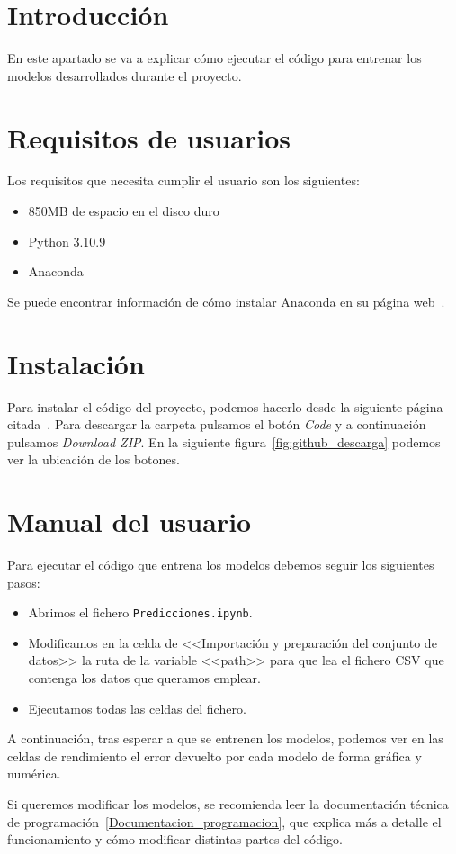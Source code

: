 
\section{Introducción}

En este apartado se va a explicar cómo ejecutar el código para entrenar los modelos desarrollados durante el proyecto.

\section{Requisitos de usuarios}

Los requisitos que necesita cumplir el usuario son los siguientes:

\begin{itemize}
    \item 850MB de espacio en el disco duro
    \item Python 3.10.9
    \item Anaconda
\end{itemize}

Se puede encontrar información de cómo instalar Anaconda en su página web~\cite{anaconda}.

\section{Instalación}

Para instalar el código del proyecto, podemos hacerlo desde la siguiente página citada~\cite{github:repo}. Para descargar la carpeta pulsamos el botón \textit{Code} y a continuación pulsamos \textit{Download ZIP}. En la siguiente figura~\ref{fig:github_descarga} podemos ver la ubicación de los botones.


\section{Manual del usuario}

Para ejecutar el código que entrena los modelos debemos seguir los siguientes pasos:

\begin{itemize}
    \item Abrimos el fichero \texttt{Predicciones.ipynb}.
    \item Modificamos en la celda de <<Importación y preparación del conjunto de datos>> la ruta de la variable <<path>> para que lea el fichero CSV que contenga los datos que queramos emplear.
    \item Ejecutamos todas las celdas del fichero.
\end{itemize}

A continuación, tras esperar a que se entrenen los modelos, podemos ver en las celdas de rendimiento el error devuelto por cada modelo de forma gráfica y numérica.

Si queremos modificar los modelos, se recomienda leer la documentación técnica de programación~\ref{Documentacion_programacion}, que explica más a detalle el funcionamiento y cómo modificar distintas partes del código.